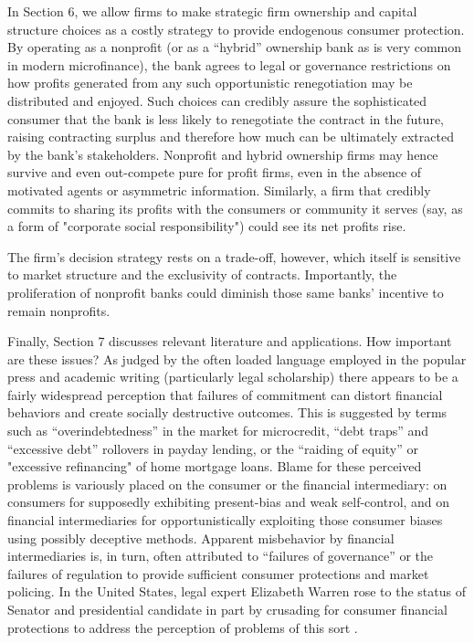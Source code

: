\documentclass[11pt,english]{article}
\theoremstyle{plain}
\theoremstyle{definition}
\begin{document}
In Section 6, we allow firms to make strategic firm ownership and capital structure choices as a costly strategy to provide endogenous consumer protection. By operating as a nonprofit (or as a ``hybrid'' ownership bank as is very common in modern microfinance), the bank agrees to legal or governance restrictions on how profits generated from any such opportunistic renegotiation may be distributed and enjoyed. Such choices can credibly assure the sophisticated consumer that the bank is less likely to renegotiate the contract in the future, raising contracting surplus and therefore how much can be ultimately extracted by the bank's stakeholders. Nonprofit and hybrid ownership firms may hence survive and  even out-compete pure for profit firms, even in the absence of motivated agents or asymmetric information. Similarly, a firm that credibly commits to sharing its profits with the consumers or community it serves (say, as a form of "corporate social responsibility") could see its net profits rise.

The firm's decision strategy rests on a trade-off, however, which itself is sensitive to market structure and the exclusivity of contracts. Importantly, the proliferation of nonprofit banks could diminish those same banks' incentive to remain nonprofits. 

Finally, Section 7 discusses relevant literature and  applications. How important are these issues? As judged by the often loaded language employed in the popular press and academic writing (particularly legal scholarship) there appears to be a fairly widespread perception that failures of commitment can distort financial behaviors and create socially destructive outcomes. This is suggested by terms such as ``overindebtedness'' in the market for microcredit, ``debt traps'' and ``excessive debt'' rollovers in payday lending, or the ``raiding of equity'' or "excessive refinancing" of home mortgage loans. Blame for these perceived problems is variously placed on the consumer or the financial intermediary: on consumers for supposedly exhibiting present-bias and weak self-control, and on financial intermediaries for opportunistically exploiting those consumer biases using possibly deceptive methods. Apparent misbehavior by financial intermediaries is, in turn, often attributed to ``failures of governance'' or the failures of regulation to provide sufficient consumer protections and market policing. In the United States, legal expert Elizabeth Warren rose to the status of Senator and presidential candidate in part by crusading for consumer financial protections to address the perception of problems of this sort \citep{sullivan2000}.
\end{document}
